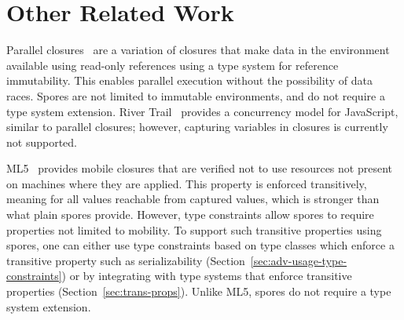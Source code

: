 \documentclass[runningheads]{llncs}
\begin{document}
\begin{sloppypar}




\section{Other Related Work}
\label{sec:related-work}

Parallel closures~\cite{ParallelClosures} are a variation of closures that
make data in the environment available using read-only references using a type
system for reference immutability. This enables parallel execution without the
possibility of data races. Spores are not limited to immutable environments,
and do not require a type system extension. River Trail~\cite{HerhutHSS13}
provides a concurrency model for JavaScript, similar to parallel closures;
however, capturing variables in closures is currently not supported.

ML5~\cite{MurphyML5} provides mobile closures that are verified not to use
resources not present on machines where they are applied. This property is
enforced transitively, meaning for all values reachable from captured values,
which is stronger than what plain spores provide. However, type constraints
allow spores to require properties not limited to mobility. To support such
transitive properties using spores, one can either use type constraints based
on type classes which enforce a transitive property such as serializability
(Section~\ref{sec:adv-usage-type-constraints}) or by integrating with type
systems that enforce transitive properties (Section~\ref{sec:trans-props}). Unlike ML5, spores
do not require a type system extension.


\end{sloppypar}
\end{document}
